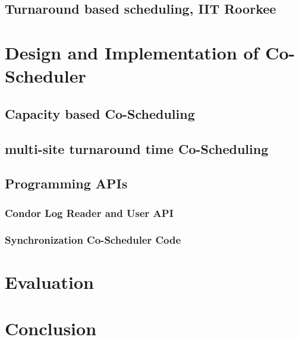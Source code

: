 \documentclass[ms,electronic,double]{nuthesis}
\begin{document}



\section{Turnaround based scheduling, IIT Roorkee}

\chapter{Design and Implementation of Co-Scheduler}
\section{Capacity based Co-Scheduling}
\section{multi-site turnaround time Co-Scheduling}
\section{Programming APIs}
\subsection{Condor Log Reader and User API}
\subsection{Synchronization Co-Scheduler Code}

\chapter{Evaluation}

\chapter{Conclusion}


\backmatter

\appendix




\nocite{*}

\end{document}
